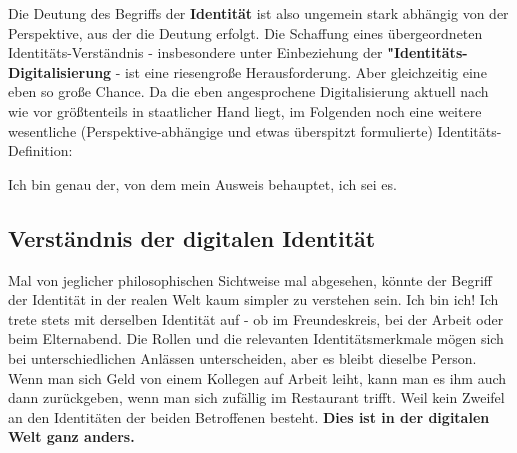 \vspace{0.3cm}


\vspace{0.3cm}

Die Deutung des Begriffs der \textbf{Identität} ist also ungemein stark abhängig von der Perspektive, aus der die Deutung erfolgt. Die Schaffung eines übergeordneten Identitäts-Verständnis - insbesondere unter Einbeziehung der \textbf{"Identitäts-Digitalisierung} - ist eine riesengroße Herausforderung. Aber gleichzeitig eine eben so große Chance. Da die eben angesprochene Digitalisierung aktuell nach wie vor größtenteils in staatlicher Hand liegt, im Folgenden noch eine weitere wesentliche (Perspektive-abhängige und etwas überspitzt formulierte) Identitäts-Definition: 

\vspace{0.3cm}

\begin{Business-Def}\label{defStaatIdentity}

Ich bin genau der, von dem mein Ausweis behauptet, ich sei es.

\end{Business-Def}

\vspace{0.5cm}

\subsection{Verständnis der digitalen Identität}
\label{sec:einleitung_digitale_identitaet}

Mal von jeglicher philosophischen Sichtweise mal abgesehen, könnte der Begriff der Identität in der realen Welt kaum simpler zu verstehen sein. Ich bin ich! Ich trete stets mit derselben Identität auf - ob im Freundeskreis, bei der Arbeit oder beim Elternabend. Die Rollen und die relevanten Identitätsmerkmale mögen sich bei unterschiedlichen Anlässen unterscheiden, aber es bleibt dieselbe Person. Wenn man sich Geld von einem Kollegen auf Arbeit leiht, kann man es ihm auch dann zurückgeben, wenn man sich zufällig im Restaurant trifft. Weil kein Zweifel an den Identitäten der beiden Betroffenen besteht. \textbf{Dies ist in der digitalen Welt ganz anders.}

